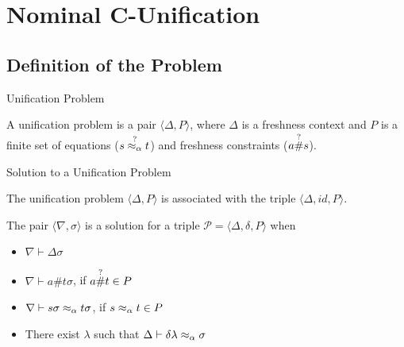 \section{Nominal C-Unification}
\subsection{Definition of the Problem}
\begin{frame}{Unification Problem}
    \begin{definition} 
        A unification problem is a pair $\langle \Delta, P \rangle$, where $\Delta$ is 
        a freshness context and $P$ is a finite set of equations ($s \overset{?}{\mathrel{\approx_\alpha}} t$) and freshness
        constraints ($a \overset{?}{\#} s$).
    \end{definition}
\end{frame}

\begin{frame}{Solution to a Unification Problem} 
    \begin{definition}
    The unification problem $\langle \Delta, P \rangle$ is associated with the triple 
    $\langle \Delta, id, P \rangle$.
    \par The pair $\langle \nabla, \sigma \rangle$ is a 
        solution for a triple $\mathcal{P} = \langle \Delta, \delta, P \rangle$ when
        \begin{itemize}
            \item $\nabla \vdash \Delta \sigma$
            \item $\nabla \vdash a\#t\sigma$, if $a\overset{?}{\#} t \in P$
            \item $\nabla \vdash s\sigma \mathrel{\approx_\alpha} t\sigma$, if $s \mathrel{\approx_\alpha} t \in P$ 
            \item There exist $\lambda$ such that $\Delta \vdash \delta\lambda \mathrel{\approx_\alpha}
                \sigma$
        \end{itemize}
    \end{definition}
\end{frame}


